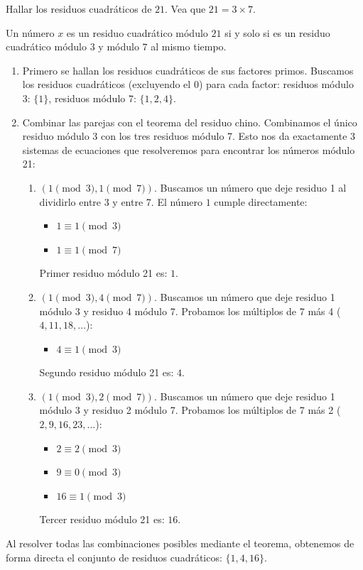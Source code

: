 \begin{ejemplo}
Hallar los residuos cuadráticos de $21$. Vea que $21 = 3 \times 7$.
\end{ejemplo}
\begin{solucion}
Un número $x$ es un residuo cuadrático módulo $21$ si y solo si es un residuo cuadrático módulo $3$ y módulo $7$ al mismo tiempo.

\begin{enumerate}
\item Primero se hallan los residuos cuadráticos de sus factores primos.
Buscamos los residuos cuadráticos (excluyendo el $0$) para cada factor:
residuos módulo 3: $\{1\}$, residuos módulo 7: $\{1, 2, 4\}$.
\item Combinar las parejas con el teorema del residuo chino. Combinamos el único residuo módulo 3 con los tres residuos módulo 7. Esto nos da exactamente 3 sistemas de ecuaciones que resolveremos para encontrar los números módulo 21:
\begin{enumerate}
\item $(1 \pmod 3, 1 \pmod 7)$. Buscamos un número que deje residuo 1 al dividirlo entre 3 y entre 7. El número $1$ cumple directamente:
\begin{itemize}
\item $1 \equiv 1 \pmod 3$
\item $1 \equiv 1 \pmod 7$
\end{itemize}
Primer residuo módulo 21 es: $1$.
\item $(1 \pmod 3, 4 \pmod 7)$. Buscamos un número que deje residuo 1 módulo 3 y residuo 4 módulo 7. Probamos los múltiplos de 7 más 4 ($4, 11, 18,\dots$):
\begin{itemize}
\item $4 \equiv 1 \pmod 3$
\end{itemize}
Segundo residuo módulo 21 es: $4$.
\item $(1 \pmod 3, 2 \pmod 7)$. Buscamos un número que deje residuo 1 módulo 3 y residuo 2 módulo 7. Probamos los múltiplos de 7 más 2 ($2, 9, 16, 23,\dots$):
\begin{itemize}
\item $2 \equiv 2 \pmod 3$
\item $9 \equiv 0 \pmod 3$
\item $16 \equiv 1 \pmod 3$
\end{itemize}
Tercer residuo módulo 21 es: $16$.
\end{enumerate}
\end{enumerate}
Al resolver todas las combinaciones posibles mediante el teorema, obtenemos de forma directa el conjunto de residuos cuadráticos: $\{1, 4, 16\}$.
\end{solucion}

